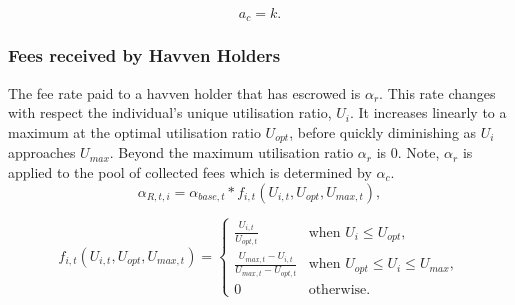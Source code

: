 $$ a_c = k.$$ 

\begin{center}
\end{center}

\newpage
\subsubsection{Fees received by Havven Holders}

\noindent The fee rate paid to a havven holder that has escrowed is $\alpha_r$. This rate changes with respect the individual's unique utilisation ratio, $U_i$. It increases linearly to a maximum at the optimal utilisation ratio $U_{opt}$, before quickly diminishing as $U_i$ approaches $U_{max}$. Beyond the maximum utilisation ratio $\alpha_r$ is 0. Note, $\alpha_r$ is applied to the pool of collected fees which is determined by $\alpha_c$. \\

$$ \alpha_{R,t,i} = \alpha_{base,t} * f_{i,t}(U_{i,t}, U_{opt}, U_{max,t}), $$

\[
f_{i,t}(U_{i,t}, U_{opt}, U_{max,t}) = 
\begin{cases}
 \frac{U_{i,t}}{U_{opt,t}} &\mbox{when } U_i \leq U_{opt}, \\[1em]
 \frac{U_{max,t} - U_{i,t}}{U_{max,t} - U_{opt,t}} &\mbox{when } U_{opt} \leq U_i \leq U_{max}, \\[1em]
 0 &\mbox{otherwise}.
 \end{cases}
\]

\begin{center}
\end{center}


